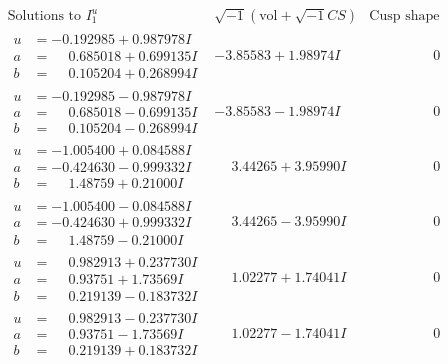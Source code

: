\documentclass[1p]{elsarticle_modified}
\theoremstyle{definition}
\newcommand{\I}{\sqrt{-1}}
\begin{document}
$$\begin{array}{c|c|c}  
\text{Solutions to }I^u_{1}& \I (\text{vol} + \sqrt{-1}CS) & \text{Cusp shape}\\
 \hline 
\begin{aligned}
u &= -0.192985 + 0.987978 I \\
a &= \phantom{-}0.685018 + 0.699135 I \\
b &= \phantom{-}0.105204 + 0.268994 I\end{aligned}
 & -3.85583 + 1.98974 I & \phantom{-0.000000 } 0 \\ \hline\begin{aligned}
u &= -0.192985 - 0.987978 I \\
a &= \phantom{-}0.685018 - 0.699135 I \\
b &= \phantom{-}0.105204 - 0.268994 I\end{aligned}
 & -3.85583 - 1.98974 I & \phantom{-0.000000 } 0 \\ \hline\begin{aligned}
u &= -1.005400 + 0.084588 I \\
a &= -0.424630 - 0.999332 I \\
b &= \phantom{-}1.48759 + 0.21000 I\end{aligned}
 & \phantom{-}3.44265 + 3.95990 I & \phantom{-0.000000 } 0 \\ \hline\begin{aligned}
u &= -1.005400 - 0.084588 I \\
a &= -0.424630 + 0.999332 I \\
b &= \phantom{-}1.48759 - 0.21000 I\end{aligned}
 & \phantom{-}3.44265 - 3.95990 I & \phantom{-0.000000 } 0 \\ \hline\begin{aligned}
u &= \phantom{-}0.982913 + 0.237730 I \\
a &= \phantom{-}0.93751 + 1.73569 I \\
b &= \phantom{-}0.219139 - 0.183732 I\end{aligned}
 & \phantom{-}1.02277 + 1.74041 I & \phantom{-0.000000 } 0 \\ \hline\begin{aligned}
u &= \phantom{-}0.982913 - 0.237730 I \\
a &= \phantom{-}0.93751 - 1.73569 I \\
b &= \phantom{-}0.219139 + 0.183732 I\end{aligned}
 & \phantom{-}1.02277 - 1.74041 I & \phantom{-0.000000 } 0 \\ \hline\begin{aligned}

\end{aligned}
\end{array}$$
\end{document}
